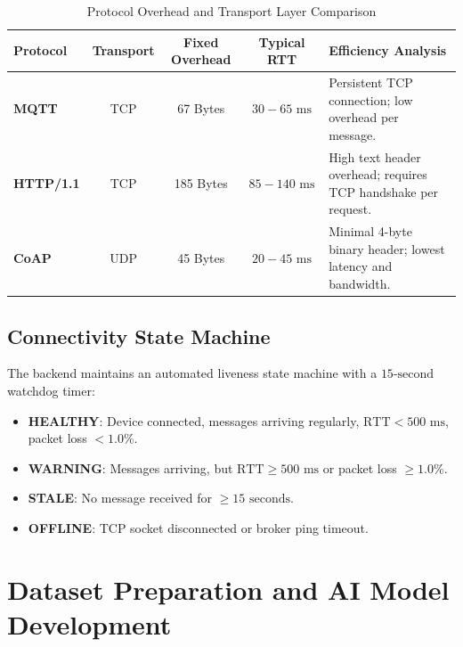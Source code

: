 \documentclass[12pt,a4paper]{report}
\begin{document}
\begin{table}[H]
\centering
\caption{Protocol Overhead and Transport Layer Comparison}
\label{tab:protocol_overhead}
\begin{tabular}{l c c c p{4.5cm}}
\toprule
\textbf{Protocol} & \textbf{Transport} & \textbf{Fixed Overhead} & \textbf{Typical RTT} & \textbf{Efficiency Analysis} \\
\midrule
\textbf{MQTT} & TCP & 67 Bytes & $30 - 65\text{ ms}$ & Persistent TCP connection; low overhead per message. \\
\textbf{HTTP/1.1} & TCP & 185 Bytes & $85 - 140\text{ ms}$ & High text header overhead; requires TCP handshake per request. \\
\textbf{CoAP} & UDP & 45 Bytes & $20 - 45\text{ ms}$ & Minimal 4-byte binary header; lowest latency and bandwidth. \\
\bottomrule
\end{tabular}
\end{table}

\section{Connectivity State Machine}
The backend maintains an automated liveness state machine with a $15\text{-second}$ watchdog timer:
\begin{itemize}
    \item \textbf{HEALTHY}: Device connected, messages arriving regularly, $\text{RTT} < 500\text{ ms}$, packet loss $< 1.0\%$.
    \item \textbf{WARNING}: Messages arriving, but $\text{RTT} \ge 500\text{ ms}$ or packet loss $\ge 1.0\%$.
    \item \textbf{STALE}: No message received for $\ge 15\text{ seconds}$.
    \item \textbf{OFFLINE}: TCP socket disconnected or broker ping timeout.
\end{itemize}

\chapter{Dataset Preparation and AI Model Development}
\end{document}
